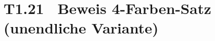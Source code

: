 \documentclass[fontsize=11pt, twoside=false, numbers=autoenddot]{scrbook}
\begin{document}
%

\section*{T1.21~ Beweis 4-Farben-Satz (unendliche Variante)}
\end{document}

